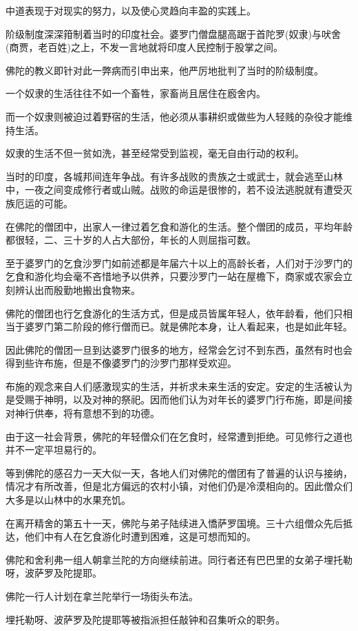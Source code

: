 \documentclass[twoside,openany]{book}
\begin{document}
中道表现于对现实的努力，以及使心灵趋向丰盈的实践上。

阶级制度深深箝制着当时的印度社会。婆罗门僧盘腿高踞于首陀罗(奴隶)与吠舍(商贾，老百姓)之上，不发一言地就将印度人民控制于股掌之间。

佛陀的教义即针对此一弊病而引申出来，他严厉地批判了当时的阶级制度。

一个奴隶的生活往往不如一个畜牲，家畜尚且居住在廏舍内。

而一个奴隶则被迫过着野宿的生活，他必须从事耕织或做些为人轻贱的杂役才能维持生活。

奴隶的生活不但一贫如洗，甚至经常受到监视，毫无自由行动的权利。

当时的印度，各城邦间连年争战。有许多战败的贵族之士或武士，就会逃至山林中，一夜之间变成修行者或山贼。战败的命运是很惨的，若不设法逃脱就有遭受灭族厄运的可能。

在佛陀的僧团中，出家人一律过着乞食和游化的生活。整个僧团的成员，平均年龄都很轻，二、三十岁的人占大部份，年长的人则屈指可数。

至于婆罗门的乞食沙罗门如前述都是年届六十以上的高龄长者，人们对于沙罗门的乞食和游化均会毫不吝惜地予以供养，只要沙罗门一站在屋檐下，商家或农家会立刻辨认出而殷勤地搬出食物来。

佛陀的僧团也行乞食游化的生活方式，但是成员皆属年轻人，依年龄看，他们只相当于婆罗门第二阶段的修行僧而已。就是佛陀本身，让人看起来，也是如此年轻。

因此佛陀的僧团一旦到达婆罗门很多的地方，经常会乞讨不到东西，虽然有时也会得到些许布施，但是不像婆罗门的沙罗门那样受欢迎。

布施的观念来自人们感激现实的生活，并祈求未来生活的安定。安定的生活被认为是受赐于神明，以及对神的祭祀。因而他们认为对年长的婆罗门行布施，即是间接对神行供奉，将有意想不到的功德。

由于这一社会背景，佛陀的年轻僧众们在乞食时，经常遭到拒绝。可见修行之道也并不一定平坦易行的。

等到佛陀的感召力一天大似一天，各地人们对佛陀的僧团有了普遍的认识与接纳，情况才有所改善，但是北方偏远的农村小镇，对他们仍是冷漠相向的。因此僧众们大多是以山林中的水果充饥。

在离开精舍的第五十一天，佛陀与弟子陆续进入憍萨罗国境。三十六组僧众先后抵达，他们中有人在乞食游化时遭到困难，这是可想而知的。

佛陀和舍利弗一组人朝拿兰陀的方向继续前进。同行者还有巴巴里的女弟子埋托勒呀，波萨罗及陀提耶。

佛陀一行人计划在拿兰陀举行一场街头布法。

埋托勒呀、波萨罗及陀提耶等被指派担任敲钟和召集听众的职务。
\end{document}
